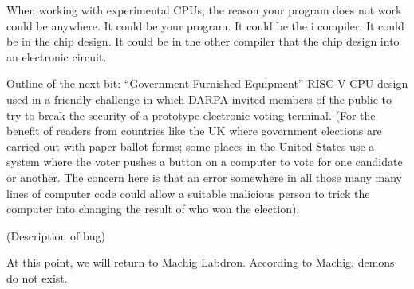 \documentclass{article}
\begin{document}
When working with experimental CPUs, the reason your program does
not work could be anywhere. It could be your program. It could be the i
compiler. It could
be in the chip design. It could be in the other compiler that
 the chip design into an electronic circuit.

Outline of the next bit: ``Government Furnished Equipment'' RISC-V
CPU design used in a friendly challenge in which DARPA invited
members of the public to try to break the security of a prototype
electronic voting terminal. (For the benefit of readers from 
countries like the UK where government elections are carried out
with paper ballot forms; some places in the United States use
a system where the voter pushes a button on a computer to vote
for one candidate or another. The concern here is that an error
somewhere in all those many many lines of computer code could
allow a suitable malicious person to trick the computer into
changing the result of who won the election).

(Description of bug)

At this point, we will return to Machig Labdron. According to
Machig, demons do not exist.

\cite{*}



\end{document}
